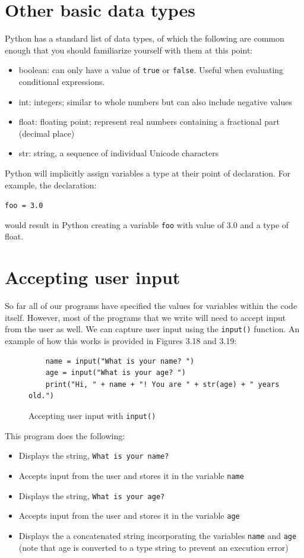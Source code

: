 \documentclass{book}
\begin{document}
\section{Other basic data types}
Python has a standard list of data types, of which the following are common enough that you should familiarize yourself with them at this point:
\begin{itemize}
	\item boolean: can only have a value of \texttt{true} or \texttt{false}. Useful when evaluating conditional expressions.
	\item int: integers; similar to whole numbers but can also include negative values
	\item float: floating point; represent real numbers containing a fractional part (decimal place)\
	\item str: string, a sequence of individual Unicode characters
\end{itemize}

Python will implicitly assign variables a type at their point of declaration. For example, the declaration:

\texttt{foo = 3.0}

would result in Python creating a variable \texttt{foo} with value of 3.0 and a type of float. 	

\section{Accepting user input}

So far all of our programs have specified the values for variables within the code itself. However, most of the programs that we write will need to accept input from the user as well. We can capture user input using the \texttt{input()} function. An example of how this works is provided in Figures 3.18 and 3.19:

\begin{figure}[h]
	\caption{Accepting user input with \texttt{input()}}
	\begin{lstlisting}
	name = input("What is your name? ")
	age = input("What is your age? ")
	print("Hi, " + name + "! You are " + str(age) + " years old.")
	\end{lstlisting}
\end{figure}

This program does the following:

\begin{itemize}
	\item Displays the string, \texttt{What is your name?}
	\item Accepts input from the user and stores it in the variable \texttt{name}
	\item Displays the string, \texttt{What is your age?}
	\item Accepts input from the user and stores it in the variable \texttt{age}
	\item Displays the a concatenated string incorporating the variables \texttt{name} and \texttt{age} (note that age is converted to a type string to prevent an execution error)
\end{itemize}
\end{document}
